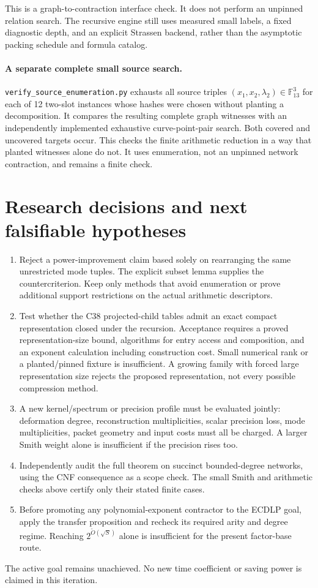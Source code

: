 \documentclass[11pt]{article}
\begin{document}
This is a graph-to-contraction interface check. It does not perform an
unpinned relation search. The recursive engine still uses measured small
labels, a fixed diagnostic depth, and an explicit Strassen backend,
rather than the asymptotic packing schedule and formula catalog.

\paragraph{A separate complete small source search.}
\texttt{verify\_source\_enumeration.py} exhausts all source triples
$(x_1,x_2,\lambda_2)\in\mathbb F_{13}^3$ for each of 12 two-slot
instances whose hashes were chosen without planting a decomposition.
It compares the resulting complete graph witnesses with an independently
implemented exhaustive curve-point-pair search. Both covered and uncovered
targets occur. This checks the finite arithmetic reduction in a way that
planted witnesses alone do not. It uses enumeration, not an unpinned
network contraction, and remains a finite check.

\section{Research decisions and next falsifiable hypotheses}
\begin{enumerate}
\item Reject a power-improvement claim based solely on rearranging the
same unrestricted mode tuples. The explicit subset lemma supplies the
countercriterion. Keep only methods that avoid enumeration or prove
additional support restrictions on the actual arithmetic descriptors.
\item Test whether the C38 projected-child tables admit an exact compact
representation closed under the recursion. Acceptance requires a proved
representation-size bound, algorithms for entry access and composition,
and an exponent calculation including construction cost. Small numerical
rank or a planted/pinned fixture is insufficient. A growing family with
forced large representation size rejects the proposed representation,
not every possible compression method.
\item A new kernel/spectrum or precision profile must be evaluated jointly:
deformation degree, reconstruction multiplicities, scalar precision loss,
mode multiplicities, packet geometry and input costs must all be charged.
A larger Smith weight alone is insufficient if the precision rises too.
\item Independently audit the full theorem on succinct bounded-degree
networks, using the CNF consequence as a scope check. The small Smith and
arithmetic checks above certify only their stated finite cases.
\item Before promoting any polynomial-exponent contractor to the ECDLP
goal, apply the transfer proposition and recheck its required arity and
degree regime. Reaching $2^{\widetilde O(\sqrt S)}$ alone is insufficient
for the present factor-base route.
\end{enumerate}
The active goal remains unachieved. No new time coefficient or saving
power is claimed in this iteration.
\end{document}
